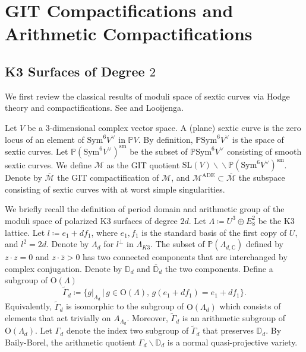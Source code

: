 \documentclass[12pt,reqno,a4paper]{amsart}
\theoremstyle{remark}
\theoremstyle{definition}
\begin{document}
            






\section{GIT Compactifications and Arithmetic Compactifications}
\label{section: compactification}

\subsection{K3 Surfaces of Degree $2$}
\label{subsection: Shah, Looijenga}
We first review the classical results of moduli space of sextic curves via Hodge theory and compactifications. 
See \cite{shah1980complete} and Looijenga.

Let $V$ be a $3$-dimensional complex vector space.
A (plane) sextic curve is the zero locus of an element of $\mathrm{Sym}^6 V^\vee$ in $\mathbb{P} V$.
By definition, $\mathbb{P}\mathrm{Sym}^6 V^\vee$ is the space of sextic curves. 
Let $\mathbb{P}(\mathrm{Sym}^6 V^\vee)^{\mathrm{sm}}$ be the subset of $\mathbb{P}\mathrm{Sym}^6 V^\vee$ consisting of smooth sextic curves.
We define $\mathcal{M}$ as the GIT quotient $\mathrm{SL}(V)\backslash\!\! \backslash\mathbb{P}(\mathrm{Sym}^6 V^\vee)^{\mathrm{sm}}$.
Denote by $\overline{\mathcal{M}}$ the GIT compactification of $\mathcal{M}$, and $\mathcal{M}^{\mathrm{ADE}}\subset \overline{\mathcal{M}}$ the subspace consisting of sextic curves with at worst simple singularities.

We briefly recall the definition of period domain and arithmetic group of the moduli space of polarized K3 surfaces of degree $2d$.
Let $\Lambda\coloneqq U^3\oplus E_8^2$ be the K3 lattice.
Let $l\coloneqq e_1+df_1$, where $e_1,f_1$ is the standard basis of the first copy of $U$, and $l^2=2d$.
Denote by $\Lambda_d$ for $l^{\perp}$ in $\Lambda_{K3}$.
The subset of $\mathbb{P}(\Lambda_{d,\mathbb{C}})$ defined by $z\cdot z=0$ and $z\cdot\bar{z}>0$ has two connected components that are interchanged by complex conjugation. Denote by $\mathbb{D}_d$ and $\overline{\mathbb{D}}_d$ the two components.
Define a subgroup of $\mathrm{O}(\Lambda)$
\begin{equation*}
    \widetilde\Gamma_d\coloneqq \{ g|_{\Lambda_d} \,\big|\, g\in \mathrm{O}(\Lambda),\, g(e_1+df_1)=e_1+df_1 \}.
\end{equation*}
Equivalently, $\widetilde\Gamma_d$ is isomorphic to the subgroup of $\mathrm{O}(\Lambda_d)$ which consists of elements that act trivially on $A_{\Lambda_d}$.
Moreover, $\widetilde\Gamma_d$ is an arithmetic subgroup of $\mathrm{O}(\Lambda_d)$.
Let $\Gamma_d$ denote the index two subgroup of $\widetilde\Gamma_d$ that preserves $\mathbb{D}_d$.
By Baily-Borel, the arithmetic quotient $\Gamma_d\backslash\mathbb{D}_d$ is a normal quasi-projective variety.
\end{document}
